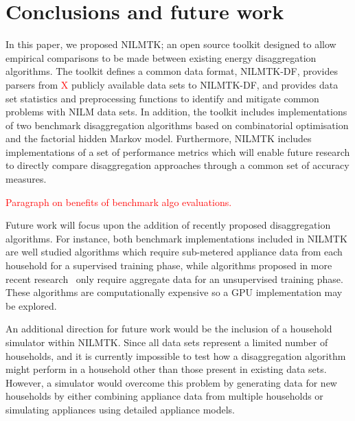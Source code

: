 \documentclass{sig-alternate}
\newcommand{\redcolor}[1]{\textcolor{red}{#1}}
\begin{document}
\section{Conclusions and future work}
\label{sec:conclusions}

\noindent
In this paper, we proposed NILMTK; an open source toolkit designed to allow empirical comparisons to be made between existing energy disaggregation algorithms. The toolkit defines a common data format, NILMTK-DF, provides parsers from \redcolor{X} publicly available data sets to NILMTK-DF, and provides data set statistics and preprocessing functions to identify and mitigate common problems with NILM data sets. In addition, the toolkit includes implementations of two benchmark disaggregation algorithms based on combinatorial optimisation and the factorial hidden Markov model. Furthermore, NILMTK includes implementations of a set of performance metrics which will enable future research to directly compare disaggregation approaches through a common set of accuracy measures.

\redcolor{Paragraph on benefits of benchmark algo evaluations.}

Future work will focus upon the addition of recently proposed disaggregation algorithms. For instance, both benchmark implementations included in NILMTK are well studied algorithms which require sub-metered appliance data from each household for a supervised training phase, while algorithms proposed in more recent research~\cite{kim_2011,parson_2012} only require aggregate data for an unsupervised training phase.  These algorithms are computationally expensive so a GPU implementation may be explored.

An additional direction for future work would be the inclusion of a household simulator within NILMTK. Since all data sets represent a limited number of households, and it is currently impossible to test how a disaggregation algorithm might perform in a household other than those present in existing data sets. However, a simulator would overcome this problem by generating data for new households by either combining appliance data from multiple households or simulating appliances using detailed appliance models.


\end{document}
